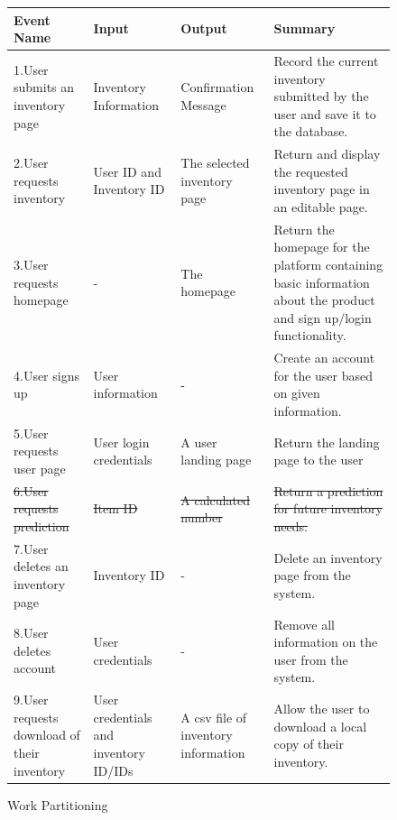 \documentclass[12pt, titlepage]{article}
\begin{document}
\begin{figure}[h]
\centering

\begin{tabular}{| p{4cm} | p{3cm} | p{3cm} | p{5cm} |}
\hline
\textbf{Event Name} & \textbf{Input} & \textbf{Output} & \textbf{Summary}\\
\hline
1.User submits an inventory page & Inventory Information & Confirmation Message & Record the current inventory submitted by the user and save it to the database.\\ \hline

2.User requests inventory & User ID and Inventory ID & The selected inventory page & Return and display the requested inventory page in an editable page.\\ \hline

3.User requests homepage & - & The homepage & Return the homepage for the platform containing basic information about the product and sign up/login functionality.\\ \hline

4.User signs up & User information & - & Create an account for the user based on given information.\\ \hline

5.User requests user page & User login credentials & A user landing page & Return the landing page to the user\\ \hline

\sout{6.User requests prediction} & \sout{Item ID} & \sout{A calculated number} & \sout{Return a prediction for future inventory needs.}\\ \hline

7.User deletes an inventory page & Inventory ID & - & Delete an inventory page from the system. \\ \hline
 
8.User deletes account & User credentials & - & Remove all information on the user from the system.\\ \hline

9.User requests download of their inventory & User credentials and inventory ID/IDs & A csv file of inventory information & Allow the user to download a local copy of their inventory.\\ \hline


\hline
\end{tabular}

\caption{Work Partitioning}
\label{fig:table1}

\end{figure}
\end{document}
